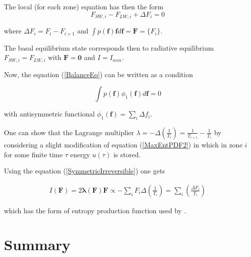 \documentclass[a4paper,12pt]{article}
\begin{document}
The local (for each zone) equation has then the form
\begin{equation}
  F_{SW,i}- F_{LW,i} + \Delta F_i = 0
\end{equation}

where $\Delta F_i = F_i - F_{i+1}$ and $\int p(\bm{f})\bm{f} d\bm{f}=\bm{F}=\{F_i\}$. 

The basal equilibrium state corresponds then to radiative equilibrium $F_{SW,i}= F_{LW,i}$ with $\bm{F}=\bm{0}$ and $I=I_{min}$.

Now, the equation (\ref{BalanceEq}) can be written as a condition

\begin{equation}
  \int p(\bm{f})\phi_1(\bm{f})d\bm{f} =0
\end{equation}

with antisymmetric functional $\phi_1(\bm{f})=\sum_i \Delta f_i$. 

One can show that the Lagrange multiplier $\lambda = - \Delta (\frac{1}{T_i}) = \frac{1}{T_{i+1}}-\frac{1}{T_i}$ by considering a slight modification of equation (\ref{MaxEntPDF2}) in which in zone $i$ for some finite time $\tau$ energy $u(\tau)$ is stored\cite{Dewar:2014ek}. 

Using the equation (\ref{SymmetricIrreversible}) one gets

\begin{equation}
\begin{aligned}
  I(\bm{F})=2 \bm{\lambda}(\bm{F})\bm{F} \propto - \sum_i F_i \Delta(\frac{1}{T_i})= \sum_i (\frac{\Delta F_i}{T_i})
\end{aligned}
\end{equation}

which has the form of entropy production function used by \cite{Paltridge:2007jf}\cite{Lorenz:J80tzZkl}.
  
\newpage
\section{Summary}



\newpage



\end{document}
